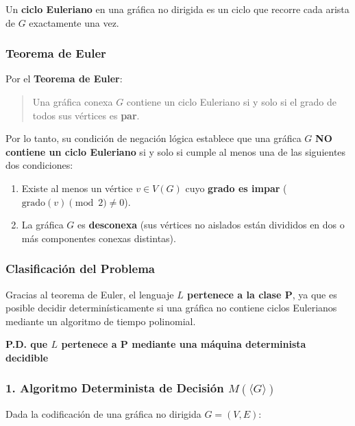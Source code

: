 \begin{itemize}[leftmargin=*]
    Un \textbf{ciclo Euleriano} en una gráfica no dirigida es un ciclo que recorre cada arista de $G$ exactamente una vez.

    \subsubsection*{Teorema de Euler}

    Por el \textbf{Teorema de Euler}:
    \begin{quote}
    Una gráfica conexa $G$ contiene un ciclo Euleriano si y solo si el grado de todos sus vértices es \textbf{par}.
    \end{quote}

    Por lo tanto, su condición de negación lógica establece que una gráfica $G$ \textbf{NO contiene un ciclo Euleriano} si y solo si cumple al menos una de las siguientes dos condiciones:
    \begin{enumerate}[label=\arabic*., leftmargin=*]
        \item Existe al menos un vértice $v \in V(G)$ cuyo \textbf{grado es impar} ($\text{grado}(v) \pmod 2 \neq 0$).
        \item La gráfica $G$ es \textbf{desconexa} (sus vértices no aislados están divididos en dos o más componentes conexas distintas).
    \end{enumerate}

    \subsubsection*{Clasificación del Problema}

    Gracias al teorema de Euler, el lenguaje \textbf{$L$ pertenece a la clase $\mathbf{P}$}, ya que es posible decidir determinísticamente si una gráfica no contiene ciclos Eulerianos mediante un algoritmo de tiempo polinomial.

    \vspace{0.3cm}
    \noindent\textbf{P.D. que $L$ pertenece a P mediante una máquina determinista decidible}

    \subsubsection*{1. Algoritmo Determinista de Decisión $M(\langle G \rangle)$}

    Dada la codificación de una gráfica no dirigida $G = (V, E)$:


\end{itemize}
